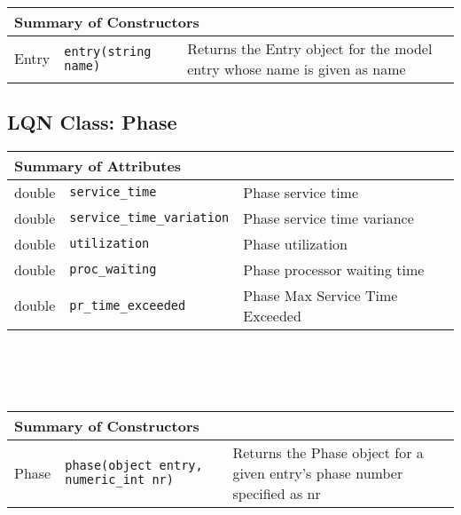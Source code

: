 \\\\\ \\
\begin{tabular}{|p{1.0in}|p{2.3in}||p{2.8in}|}
  \hline
  \multicolumn{3}{|l|}{\textbf{Summary of Constructors}}\\
  \hline
  Entry & {\tt entry(string name)} & Returns the Entry object for the model entry whose name is given as name\\
  \hline
\end{tabular}

\subsection{LQN Class: Phase}
\begin{tabular}{|p{1.0in}|p{2.3in}||p{2.8in}|}
  \hline
  \multicolumn{3}{|l|}{\textbf{Summary of Attributes}}\\
  \hline
  double & {\tt service\_time} & Phase service time\\
  double & {\tt service\_time\_variation} & Phase service time variance\\
  double & {\tt utilization} & Phase utilization\\
  double & {\tt proc\_waiting} & Phase processor waiting time\\
  double & {\tt pr\_time\_exceeded} & Phase Max Service Time Exceeded\\
  \hline
\end{tabular}
\\\\\ \\
\begin{tabular}{|p{1.0in}|p{2.3in}||p{2.8in}|}
  \hline
  \multicolumn{3}{|l|}{\textbf{Summary of Constructors}}\\
  \hline
  Phase & {\tt phase(object entry, numeric\_int nr)} & Returns the Phase object for a given entry's phase number specified as nr\\
  \hline
\end{tabular}

